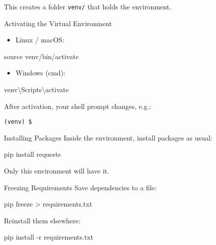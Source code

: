 \documentclass[
  letterpaper,
  DIV=11,
  numbers=noendperiod]{scrreprt}
\newenvironment{Shaded}{\begin{snugshade}}{\end{snugshade}}
\newcommand{\AttributeTok}[1]{\textcolor[rgb]{0.40,0.45,0.13}{#1}}
\newcommand{\BuiltInTok}[1]{\textcolor[rgb]{0.00,0.23,0.31}{#1}}
\newcommand{\ExtensionTok}[1]{\textcolor[rgb]{0.00,0.23,0.31}{#1}}
\newcommand{\NormalTok}[1]{\textcolor[rgb]{0.00,0.23,0.31}{#1}}
\newcommand{\OperatorTok}[1]{\textcolor[rgb]{0.37,0.37,0.37}{#1}}
\providecommand{\tightlist}{%
  \setlength{\itemsep}{0pt}\setlength{\parskip}{0pt}}
\begin{document}
This creates a folder \texttt{venv/} that holds the environment.

Activating the Virtual Environment

\begin{itemize}
\tightlist
\item
  Linux / macOS:
\end{itemize}

\begin{Shaded}
\begin{Highlighting}[]
\BuiltInTok{source}\NormalTok{ venv/bin/activate}
\end{Highlighting}
\end{Shaded}

\begin{itemize}
\tightlist
\item
  Windows (cmd):
\end{itemize}

\begin{Shaded}
\begin{Highlighting}[]
\ExtensionTok{venv\textbackslash{}Scripts\textbackslash{}activate}
\end{Highlighting}
\end{Shaded}

After activation, your shell prompt changes, e.g.:

\begin{verbatim}
(venv) $
\end{verbatim}

Installing Packages Inside the environment, install packages as usual:

\begin{Shaded}
\begin{Highlighting}[]
\ExtensionTok{pip}\NormalTok{ install requests}
\end{Highlighting}
\end{Shaded}

Only this environment will have it.

Freezing Requirements Save dependencies to a file:

\begin{Shaded}
\begin{Highlighting}[]
\ExtensionTok{pip}\NormalTok{ freeze }\OperatorTok{\textgreater{}}\NormalTok{ requirements.txt}
\end{Highlighting}
\end{Shaded}

Reinstall them elsewhere:

\begin{Shaded}
\begin{Highlighting}[]
\ExtensionTok{pip}\NormalTok{ install }\AttributeTok{{-}r}\NormalTok{ requirements.txt}
\end{Highlighting}
\end{Shaded}
\end{document}
